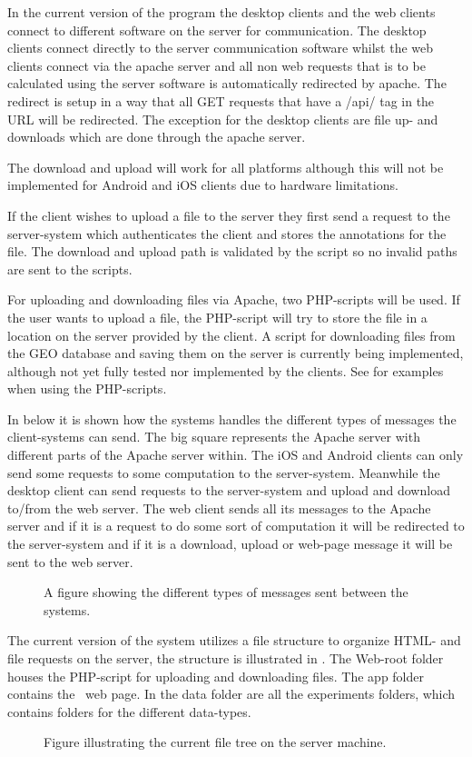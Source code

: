 In the current version of the program the desktop clients and the web clients connect to different software on the server for communication. The desktop clients connect directly to the server communication software whilst the web clients connect via the apache server and all non web requests that is to be calculated using the server software is automatically redirected by apache.
The redirect is setup in a way that all GET requests that have a /api/ tag in the URL will be redirected.
The exception for the desktop clients are file up- and downloads which are done through the apache server.

The download and upload will work for all platforms although this will not be implemented for Android and iOS clients due to hardware limitations.

If the client wishes to upload a file to the server they first send a request to the server-system which authenticates the client and stores the annotations for the file. The download and upload path is validated by the script so no invalid paths are sent to the scripts.

For uploading and downloading files via Apache, two PHP-scripts will be used. If the user wants to upload a file, the PHP-script will try to store the file in a location on the server provided by the client. A script for downloading files from the GEO database and saving them on the server is currently being  implemented, although not yet fully tested nor implemented by the clients. See  for examples when using the PHP-scripts.

In  below it is shown how the systems handles the different types of messages the client-systems can send. The big square represents the Apache server with different parts of the Apache server within. The iOS and Android clients can only send some requests to some computation to the server-system. Meanwhile the desktop client can send requests to the server-system and upload and download to/from the web server. The web client sends all its messages to the Apache server and if it is a request to do some sort of computation it will be redirected to the server-system and if it is a download, upload or web-page message it will be sent to the web server.

\begin{figure}[hbt]
\caption{A figure showing the different types of messages sent between the systems.}
\label{fig:exp_flow}
\end{figure}

The current version of the system utilizes a file structure to organize HTML- and file requests on the server, the structure is illustrated in . The Web-root folder houses the PHP-script for uploading and downloading files. The app folder contains the \appName\ web page. In the data folder are all the experiments folders, which contains folders for the different data-types.

\begin{figure}[hbt]
\caption{Figure illustrating the current file tree on the server machine.}
\label{fig:exp_filestructure}
\end{figure}
